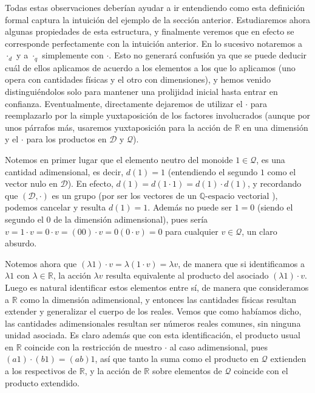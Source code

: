 \documentclass{article}
\def\qev{$\mathbb{Q} \mbox{-espacio vectorial } $}
\def\Dimensions{\mathcal D}
\def\Quantities{\mathcal Q}
\begin{document}
Todas estas observaciones deberían ayudar a ir entendiendo como esta definición formal captura la intuición del ejemplo de la sección anterior.
Estudiaremos ahora algunas propiedades de esta estructura, y finalmente veremos que en efecto se corresponde perfectamente con la intuición anterior.
En lo sucesivo notaremos a $\cdot_d$ y a $\cdot_q$ simplemente con $\cdot$. Esto no generará confusión ya que se puede deducir cuál
de ellos aplicamos de acuerdo a los elementos a los que lo aplicamos (uno opera con cantidades físicas y el otro con dimensiones), y hemos venido distinguiéndolos solo para mantener una
prolijidad inicial hasta entrar en confianza. Eventualmente, directamente dejaremos de utilizar el $\cdot$ para reemplazarlo
por la simple yuxtaposición de los factores involucrados (aunque por unos párrafos más, usaremos yuxtaposición para la acción de $\mathbb{R}$ en una dimensión y
el $\cdot$ para los productos en $\Dimensions$ y $\Quantities$).

Notemos en primer lugar que el elemento neutro del monoide $1 \in \Quantities$, es una cantidad adimensional, es decir, $d(1) = 1$
(entendiendo el segundo $1$ como el vector nulo en $\Dimensions$).
En efecto, $d(1) = d(1 \cdot 1) = d(1) \cdot d(1)$, y recordando que $(\Dimensions, \cdot)$ es un grupo (por ser los vectores de un \qev),
podemos cancelar y resulta $d(1) = 1$. Además no puede ser $1 = 0$ (siendo el segundo el $0$ de la dimensión adimensional), pues
sería $v = 1 \cdot v = 0 \cdot v = (0 0) \cdot v = 0 (0 \cdot v) = 0$ para cualquier $v \in \Quantities$, un claro absurdo.

Notemos ahora que $(\lambda 1) \cdot v = \lambda (1 \cdot v) = \lambda v$, de manera que si identificamos a $\lambda 1$ con $\lambda \in \mathbb{R}$,
la acción $\lambda v$ resulta equivalente al producto del asociado $(\lambda 1) \cdot v$. Luego es natural identificar estos elementos
entre sí, de manera que consideramos a $\mathbb{R}$ como la dimensión adimensional, y entonces las cantidades físicas resultan
extender y generalizar el cuerpo de los reales. Vemos que como habíamos dicho, las cantidades adimensionales resultan ser números
reales comunes, sin ninguna unidad asociada. Es claro además que con esta identificación, el producto usual en $\mathbb{R}$ coincide
con la restricción de nuestro $\cdot$ al caso adimensional, pues $(a 1) \cdot (b 1) =  (ab)1$, así que tanto la suma como el producto
en $\Quantities$ extienden a los respectivos de $\mathbb{R}$, y la acción de $\mathbb{R}$ sobre elementos de $\Quantities$ coincide
con el producto extendido.
\end{document}
